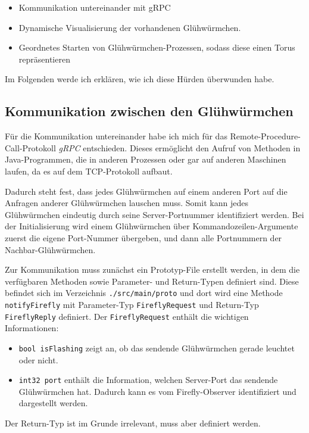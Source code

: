 \documentclass[12pt]{article}
\begin{document}
\begin{itemize}
	\item Kommunikation untereinander mit gRPC
	\item Dynamische Visualisierung der vorhandenen Glühwürmchen.
	\item Geordnetes Starten von Glühwürmchen-Prozessen, sodass diese einen Torus repräsentieren
\end{itemize}

Im Folgenden werde ich erklären, wie ich diese Hürden überwunden habe.

\subsection*{Kommunikation zwischen den Glühwürmchen}
Für die Kommunikation untereinander habe ich mich für das Remote-Procedure-Call-Protokoll \emph{gRPC} entschieden. Dieses ermöglicht den Aufruf von Methoden in Java-Programmen, die in anderen Prozessen oder gar auf anderen Maschinen laufen, da es auf dem TCP-Protokoll aufbaut.

Dadurch steht fest, dass jedes Glühwürmchen auf einem anderen Port auf die Anfragen anderer Glühwürmchen lauschen muss. Somit kann jedes Glühwürmchen eindeutig durch seine Server-Portnummer identifiziert werden. Bei der Initialisierung wird einem Glühwürmchen über Kommandozeilen-Argumente zuerst die eigene Port-Nummer übergeben, und dann alle Portnummern der Nachbar-Glühwürmchen.

Zur Kommunikation muss zunächst ein Prototyp-File erstellt werden, in dem die verfügbaren Methoden sowie Parameter- und Return-Typen definiert sind. Diese befindet sich im Verzeichnis \texttt{./src/main/proto} und dort wird eine Methode \texttt{notifyFirefly} mit Parameter-Typ \texttt{FireflyRequest} und Return-Typ \texttt{FireflyReply} definiert.
Der \texttt{FireflyRequest} enthält die wichtigen Informationen: 
\begin{itemize}
	\item \texttt{bool isFlashing} zeigt an, ob das sendende Glühwürmchen gerade leuchtet oder nicht.
	\item \texttt{int32 port} enthält die Information, welchen Server-Port das sendende Glühwürmchen hat. Dadurch kann es vom Firefly-Observer identifiziert und dargestellt werden.
\end{itemize}

Der Return-Typ ist im Grunde irrelevant, muss aber definiert werden.


	
\end{document}
